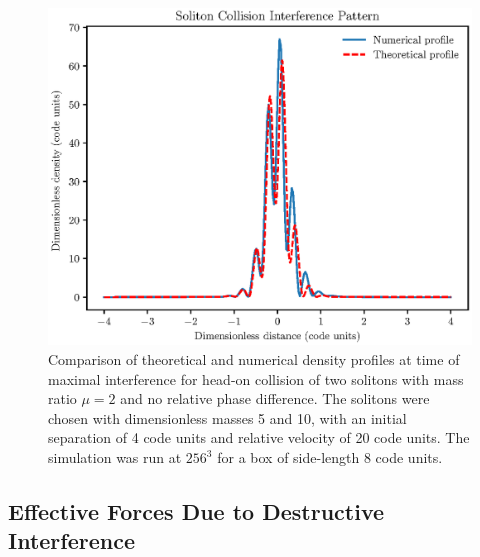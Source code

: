 \documentclass[a4paper,11pt]{article}
\begin{document}
\begin{figure}
  \includegraphics[trim={0 0 0 0.9cm},clip, scale=0.9]{interference_patterns}
  \caption{Comparison of theoretical and numerical density profiles at time of maximal interference for head-on collision of two solitons with mass ratio $\mu=2$ and no relative phase difference. The solitons were chosen with dimensionless masses 5 and 10, with an initial separation of 4 code units and relative velocity of 20 code units. The simulation was run at $256^3$ for a box of side-length 8 code units.}
  \label{fig:interference}
\end{figure}


\subsection{Effective Forces Due to Destructive Interference}
\end{document}
